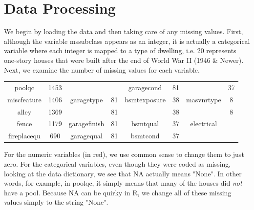 \documentclass[12pt]{article}
\begin{document}

\tableofcontents
\pagebreak

\centering
\section{Data Processing}

\begin{flushleft}

We begin by loading the data and then taking care of any missing values. First, although the variable mssubclass appears as an integer, it is actually a categorical variable where each integer is mapped to a type of dwelling, i.e. 20 represents one-story houses that were built after the end of World War II (1946 & Newer). \newline Next, we examine the number of missing values for each variable.

\begin{center}

\begin{tabular}{ |c|c|c|c|c|c|c|c|}
\hline
poolqc & 1453 & \color{red}{lotfrontage} & \color{blue}{259} & garagecond & 81 & \color{red}{bsmtfintype1} & 37\\ 
miscfeature & 1406 & garagetype & 81 & bsmtexposure & 38 & masvnrtype & 8\\
alley & 1369 & \color{red}{garageyrblt} & 81 & \color{red}{bsmtfintype2} & 38 & \color{red}{masvnrarea} & 8\\
fence & 1179 & garagefinish & 81 & bsmtqual & 37 & electrical & \color{blue}{1}\\
fireplacequ & 690 & garagequal & 81 & bsmtcond & 37 & &\\

\hline

\end{tabular}
\end{center} 

For the numeric variables (in red), we use common sense to change them to just zero. For the categorical variables, even though they were coded as missing, looking at the data dictionary, we see that NA actually means "None". In other words, for example, in poolqc, it simply means that many of the houses did \textit{not} have a pool. Because NA can be quirky in R, we change all of these missing values simply to the string "None". \newline 


\end{flushleft}
\end{document}
